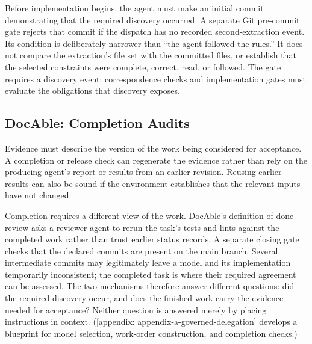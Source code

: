 Before implementation begins, the agent must make an initial commit demonstrating that the required discovery occurred. A separate Git pre-commit gate rejects that commit if the dispatch has no recorded second-extraction event. Its condition is deliberately narrower than ``the agent followed the rules.'' It does not compare the extraction's file set with the committed files, or establish that the selected constraints were complete, correct, read, or followed. The gate requires a discovery event; correspondence checks and implementation gates must evaluate the obligations that discovery exposes.

\subsection{DocAble: Completion Audits}\label{heading:docable-completion-audits}


Evidence must describe the version of the work being considered for acceptance. A completion or release check can regenerate the evidence rather than rely on the producing agent's report or results from an earlier revision. Reusing earlier results can also be sound if the environment establishes that the relevant inputs have not changed.

Completion requires a different view of the work. DocAble's definition-of-done review asks a reviewer agent to rerun the task's tests and lints against the completed work rather than trust earlier status records. A separate closing gate checks that the declared commits are present on the main branch. Several intermediate commits may legitimately leave a model and its implementation temporarily inconsistent; the completed task is where their required agreement can be assessed. The two mechanisms therefore answer different questions: did the required discovery occur, and does the finished work carry the evidence needed for acceptance? Neither question is answered merely by placing instructions in context. ({[}appendix: appendix-a-governed-delegation{]} develops a blueprint for model selection, work-order construction, and completion checks.)

